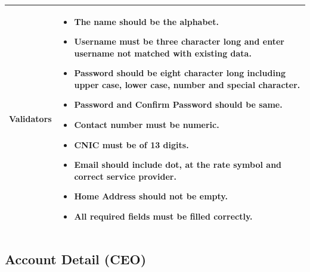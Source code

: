 \documentclass[12pt,a4paper]{article}
\begin{document}
\begin{longtable}{| p{3cm}|p{12cm}|}
Validators & 
\begin{itemize}
\item  The name should be the alphabet.
\item  Username must be three character long and enter username not matched with existing data.
\item Password should be eight character long including upper case, lower case, number and special character.

\item  Password and Confirm Password should be same.
\item  Contact number must be numeric. 
\item  CNIC must be of 13 digits.
\item  Email should include dot, at the rate symbol and correct service provider.
\item Home Address should not be empty. 
\item All required fields must be filled correctly. 
\end{itemize}
\\ \hline

\end{longtable} 
\subsection{Account Detail (CEO) }
\end{document}
